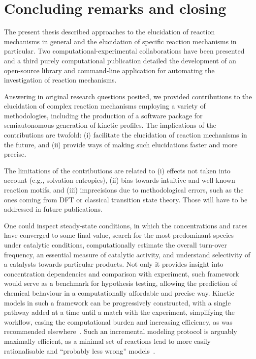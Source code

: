 \chapter{Concluding remarks and closing}%
\label{ch:conclusion}

The present thesis described approaches to the elucidation of reaction
mechanisms in general and the elucidation of specific reaction mechanisms in
particular.
Two computational-experimental collaborations have been presented and a third
purely computational publication detailed the development of an open-source
library and command-line application for automating the investigation of
reaction mechanisms.

Answering in original research questions posited, we provided contributions
to the elucidation of complex reaction mechanisms employing a variety of methodologies,
including the production of a software package for semiautonomous generation of kinetic profiles.
The implications of the contributions are twofold:
(i) facilitate the elucidation of reaction mechanisms in the future, and
(ii) provide ways of making such elucidations faster and more precise.

The limitations of the contributions are related to
(i) effects not taken into account (e.g., solvation entropies),
(ii) bias towards intuitive and well-known reaction motifs, and
(iii) imprecisions due to methodological errors, such as the ones coming from DFT or classical transition state theory.
Those will have to be addressed in future publications.


One could inspect steady-state conditions, in which the concentrations and rates have converged to some final value, search for the most predominant species under catalytic conditions, computationally estimate the overall turn-over frequency, an essential measure of catalytic activity, and understand selectivity of a catalysts towards particular products.
Not only it provides insight into concentration dependencies and comparison with experiment, such framework would serve as a benchmark for hypothesis testing, allowing the prediction of chemical behaviour in a computationally affordable and precise way.
Kinetic models in such a framework can be progressively constructed, with a single pathway added at a time until a match with the experiment, simplifying the workflow, easing the computational burden and increasing efficiency, as was recommended elsewhere~\cite{Jara_z_2019}.
Such an incremental modeling protocol is arguably maximally efficient, as a
minimal set of reactions lead to more easily rationalisable and
``probably less wrong'' models~\cite{Blackmond_2015,Jara_z_2019}.
